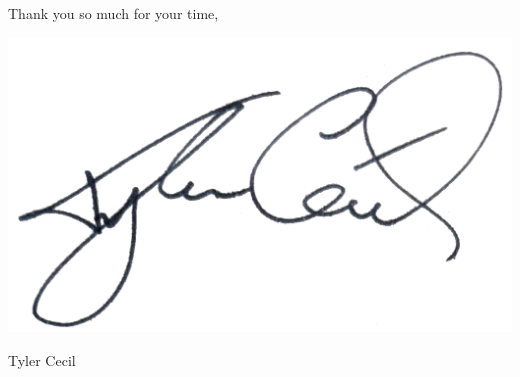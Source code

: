 \documentclass{tc_cv}
\begin{document}
\begin{adjustwidth}{40pt}{40pt}
  \begin{minipage}{0.5\linewidth}
    Thank you so much for your time,
    \vspace{1em}
  \end{minipage}
  \begin{minipage}{0.5\linewidth}
    \hfill\includegraphics[height=4.5\baselineskip]{sig}

    \vspace{-2em}
    \hfill Tyler Cecil
  \end{minipage}

\end{adjustwidth}
\end{document}

